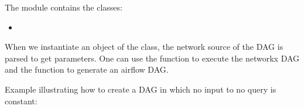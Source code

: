 \documentclass[letterpaper,10pt,english]{sphinxmanual}
\begin{document}
The {\hyperref[\detokenize{dag:module-create_dag}]{}} module contains the classes:
\begin{itemize}
\item {} 
{\hyperref[\detokenize{dag:create_dag.DAG}]{}}

\end{itemize}

When we instantiate an object of the class, the network source of the DAG is parsed to get parameters.
One can use the function {\hyperref[\detokenize{dag:create_dag.DAG.feed_forward}]{}} to execute the networkx DAG and the
function {\hyperref[\detokenize{dag:create_dag.DAG.generate_dag}]{}} to generate an airflow DAG.

Example illustrating how to create a DAG  in which no input to no query is constant:
\end{document}
